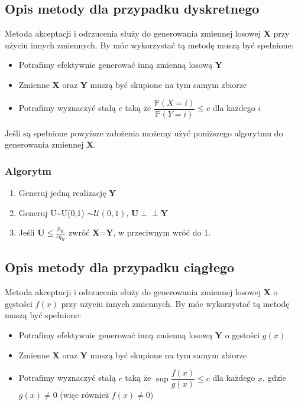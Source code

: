 \documentclass[12pt]{mwrep}
\newcommand{\indep}{\perp \!\!\! \perp}
\begin{document}
	\subsection{Opis metody dla przypadku dyskretnego\textsuperscript{\cite{AO - dyskretny}}}
	Metoda akceptacji i odrzucenia służy do generowania zmiennej losowej \textbf{X} przy użyciu innych zmiennych. By móc wykorzystać tą metodę muszą być spełnione:
	\begin{itemize}[leftmargin=10mm]
		\item Potrafimy efektywnie generować inną zmienną losową \textbf{Y}
		\item Zmienne \textbf{X} oraz \textbf{Y} muszą być skupione na tym samym zbiorze
		\item Potrafimy wyznaczyć stałą $c$ taką że $\dfrac{\mathbb{P}(X=i)}{\mathbb{P}(Y=i)}\leqslant c$ dla każdego $i$
	\end{itemize}
	Jeśli są spełnione powyższe założenia możemy użyć poniższego algorytmu do generowania zmiennej \textbf{X}.
	\subsubsection{Algorytm}
	\begin{enumerate}[leftmargin=10mm]
		\item Generuj jedną realizację \textbf{Y}
		\item Generuj U\textasciitilde U(0,1) $\sim \mathcal{U}(0,1)$, $\textbf{U}\boldsymbol{\indep} \textbf{Y}$
		\item Jeśli $\textbf{U}\leqslant\frac{p_\textbf{Y}}{cq_\textbf{Y}}$ zwróć \textbf{X}=\textbf{Y}, w przeciwnym wróć do 1.
	\end{enumerate}
	
	
	\subsection{Opis metody dla przypadku ciągłego\textsuperscript{\cite{AO - ciagly}}}
	Metoda akceptacji i odrzucenia służy do generowania zmiennej losowej \textbf{X} o gęstości $f(x)$ przy użyciu innych zmiennych. By móc wykorzystać tą metodę muszą być spełnione:
	\begin{itemize}[leftmargin=10mm]
		\item Potrafimy efektywnie generować inną zmienną losową \textbf{Y} o gęstości $g(x)$
		\item Zmienne \textbf{X} oraz \textbf{Y} muszą być skupione na tym samym zbiorze
		\item Potrafimy wyznaczyć stałą $c$ taką że $\sup\dfrac{f(x)}{g(x)}\leqslant c$ dla każdego $x$, gdzie $g(x)\neq0$ (więc również $f(x)\neq0$)
	\end{itemize}
\end{document}
